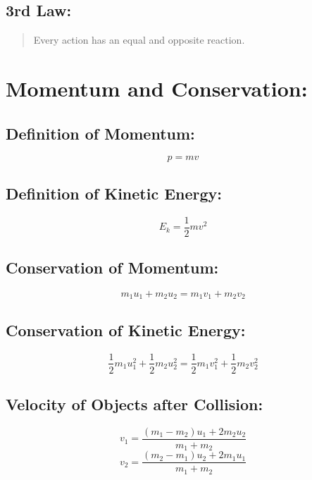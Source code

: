 \documentclass[a4paper]{report}
\begin{document}
        \subsection{3rd Law: }
            \begin{quotation}
                \item Every action has an equal and opposite reaction.
            \end{quotation}
    
    \section{Momentum and Conservation: }
        \subsection{Definition of Momentum: }
            \begin{equation}
                p = mv
            \end{equation}
        \subsection{Definition of Kinetic Energy: }
            \begin{equation}
                E_k = \frac{1}{2}m v^2
            \end{equation}
        \subsection{Conservation of Momentum: }
            \begin{equation}
                m_1 u_1 + m_2 u_2 = m_1 v_1 + m_2 v_2
            \end{equation}
        \subsection{Conservation of Kinetic Energy: }
            \begin{equation}
                \frac{1}{2} m_1 u_1^2 + \frac{1}{2} m_2 u_2^2 = \frac{1}{2} m_1 v_1^2 + \frac{1}{2} m_2 v_2^2
            \end{equation}
        \subsection{Velocity of Objects after Collision: }
            \begin{equation}
                v_1 = \frac{(m_1 - m_2)u_1 + 2 m_2 u_2}{m_1 + m_2}
            \end{equation}
            \begin{equation}
                v_2 = \frac{(m_2 - m_1)u_2 + 2 m_1 u_1}{m_1 + m_2}
            \end{equation}
\end{document}
